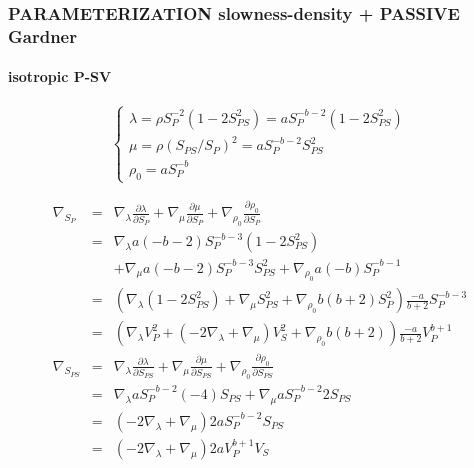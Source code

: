 \documentclass[9pt]{beamer}
\newcommand{\partderi}[2]{\frac{\partial#1}{\partial#2}}
\begin{document}
\begin{frame}\frametitle{PARAMETERIZATION slowness-density  + PASSIVE Gardner}
\framesubtitle{isotropic P-SV}

  \begin{center}
  \end{center}
  
  \[\left\{ \begin{array}{l}
    \lambda = \rho S_P^{-2} (1-2S_{PS}^2) = a S_P^{-b-2} (1-2S_{PS}^2) \\
    \mu    = \rho (S_{PS}/S_P)^2 = a S_P^{-b-2} S_{PS}^2\\
    \rho_0 = a S_P^{-b}
  \end{array} \right.\]
  
  \begin{eqnarray}
    \nabla_{S_P} &=& \nabla_\lambda \partderi{\lambda}{S_P} + \nabla_\mu \partderi{\mu}{S_P} + \nabla_{\rho_0} \partderi{\rho_0}{S_P} \nonumber\\
		 &=& \nabla_\lambda a(-b-2)S_P^{-b-3}(1-2S_{PS}^2) \nonumber\\
		 & &+\nabla_\mu a(-b-2) S_P^{-b-3}S_{PS}^2 + \nabla_{\rho_0} a(-b)S_P^{-b-1} \nonumber\\
		 &=& \left(\nabla_\lambda (1-2S_{PS}^2) + \nabla_\mu S_{PS}^2 + \nabla_{\rho_0} b(b+2)S_P^2 \right) \frac{-a}{b+2} S_P^{-b-3} \nonumber\\
		 &=& \left(\nabla_\lambda V_P^2 + (-2\nabla_\lambda + \nabla_\mu) V_S^2 + \nabla_{\rho_0} b(b+2) \right) \frac{-a}{b+2} V_P^{b+1} \nonumber\\
    \nabla_{S_{PS}} &=& \nabla_\lambda \partderi{\lambda}{S_{PS}} + \nabla_\mu \partderi{\mu}{S_{PS}} + \nabla_{\rho_0} \partderi{\rho_0}{S_{PS}} \nonumber\\
		    &=& \nabla_\lambda a S_P^{-b-2} (-4)S_{PS} + \nabla_\mu a S_P^{-b-2} 2S_{PS} \nonumber\\
		    &=& \left(-2\nabla_\lambda + \nabla_\mu \right) 2aS_P^{-b-2}S_{PS} \nonumber\\
		    &=& \left(-2\nabla_\lambda + \nabla_\mu \right) 2aV_P^{b+1}V_S \nonumber
  \end{eqnarray}

\end{frame}
\end{document}
